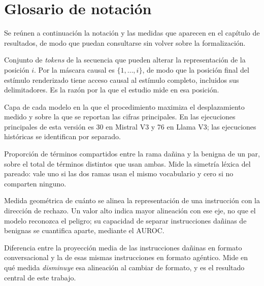 \chapter*{Glosario de notación}

Se reúnen a continuación la notación y las medidas que aparecen en el capítulo de resultados, de modo que puedan consultarse sin volver sobre la formalización.

\begin{description}[leftmargin=0pt, labelwidth=0pt, labelsep=0pt, style=nextline, itemsep=0.45em]

  \item[Cono de influencia ($\mathcal{C}(i)$)] Conjunto de \textit{tokens} de la secuencia que pueden alterar la representación de la posición $i$. Por la máscara causal es $\{1, \dots, i\}$, de modo que la posición final del estímulo renderizado tiene acceso causal al estímulo completo, incluidos sus delimitadores. Es la razón por la que el estudio mide en esa posición.

  \item[Capa de referencia] Capa de cada modelo en la que el procedimiento maximiza el desplazamiento medido y sobre la que se reportan las cifras principales. En las ejecuciones principales de esta versión es 30 en Mistral V3 y 76 en Llama V3; las ejecuciones históricas se identifican por separado.

  \item[Índice de Jaccard ($J$)] Proporción de términos compartidos entre la rama dañina y la benigna de un par, sobre el total de términos distintos que usan ambas. Mide la simetría léxica del pareado: vale uno si las dos ramas usan el mismo vocabulario y cero si no comparten ninguno.

  \item[Proyección ($p$)] Medida geométrica de cuánto se alinea la representación de una instrucción con la dirección de rechazo. Un valor alto indica mayor alineación con ese eje, no que el modelo reconozca el peligro; su capacidad de separar instrucciones dañinas de benignas se cuantifica aparte, mediante el AUROC.

  \item[Gap de proyección ($\Delta p_{h}$)] Diferencia entre la proyección media de las instrucciones dañinas en formato conversacional y la de esas mismas instrucciones en formato agéntico. Mide en qué medida \emph{disminuye} esa alineación al cambiar de formato, y es el resultado central de este trabajo.


\end{description}
